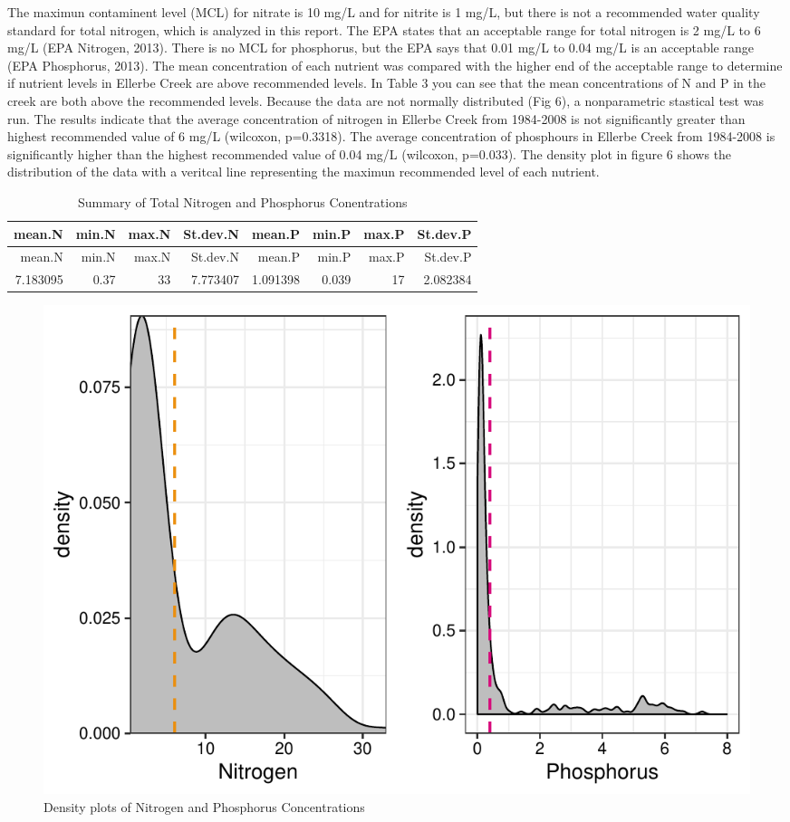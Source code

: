\documentclass[12pt,]{article}
\begin{document}
The maximun contaminent level (MCL) for nitrate is 10 mg/L and for
nitrite is 1 mg/L, but there is not a recommended water quality standard
for total nitrogen, which is analyzed in this report. The EPA states
that an acceptable range for total nitrogen is 2 mg/L to 6 mg/L (EPA
Nitrogen, 2013). There is no MCL for phosphorus, but the EPA says that
0.01 mg/L to 0.04 mg/L is an acceptable range (EPA Phosphorus, 2013).
The mean concentration of each nutrient was compared with the higher end
of the acceptable range to determine if nutrient levels in Ellerbe Creek
are above recommended levels. In Table 3 you can see that the mean
concentrations of N and P in the creek are both above the recommended
levels. Because the data are not normally distributed (Fig 6), a
nonparametric stastical test was run. The results indicate that the
average concentration of nitrogen in Ellerbe Creek from 1984-2008 is not
significantly greater than highest recommended value of 6 mg/L
(wilcoxon, p=0.3318). The average concentration of phosphours in Ellerbe
Creek from 1984-2008 is significantly higher than the highest
recommended value of 0.04 mg/L (wilcoxon, p=0.033). The density plot in
figure 6 shows the distribution of the data with a veritcal line
representing the maximun recommended level of each nutrient.

\begin{longtable}[]{@{}rrrrrrrr@{}}
\caption{Summary of Total Nitrogen and Phosphorus
Conentrations}\tabularnewline
\toprule
mean.N & min.N & max.N & St.dev.N & mean.P & min.P & max.P &
St.dev.P\tabularnewline
\midrule
\endfirsthead
\toprule
mean.N & min.N & max.N & St.dev.N & mean.P & min.P & max.P &
St.dev.P\tabularnewline
\midrule
\endhead
7.183095 & 0.37 & 33 & 7.773407 & 1.091398 & 0.039 & 17 &
2.082384\tabularnewline
\bottomrule
\end{longtable}

\newpage

\begin{figure}
\centering
\includegraphics{Landman_ENV872_Project_files/figure-latex/Data Analysis Figure 6-1.pdf}
\caption{Density plots of Nitrogen and Phosphorus Concentrations}
\end{figure}
\end{document}
